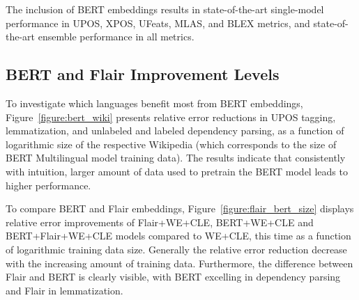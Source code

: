 \documentclass[11pt,a4paper]{article}
\begin{document}
The inclusion of BERT embeddings results in state-of-the-art single-model performance in UPOS, XPOS,
UFeats, MLAS, and BLEX metrics, and state-of-the-art ensemble performance in
all metrics. 

\subsection{BERT and Flair Improvement Levels}

To investigate which languages benefit most from BERT embeddings,
Figure~\ref{figure:bert_wiki} presents relative error
reductions in UPOS tagging, lemmatization, and unlabeled and labeled
dependency parsing, as a function of logarithmic size of the respective Wikipedia
(which corresponds to the size of BERT Multilingual model training data).
The results indicate that consistently with intuition, larger amount of
data used to pretrain the BERT model leads to higher performance.

To compare BERT and Flair embeddings, Figure~\ref{figure:flair_bert_size}
displays relative error improvements of Flair+WE+CLE, BERT+WE+CLE and
BERT+Flair+WE+CLE models compared to WE+CLE, this time as a function of
logarithmic training data size. Generally the relative error reduction decrease
with the increasing amount of training data. Furthermore, the difference
between Flair and BERT is clearly visible, with BERT excelling in dependency
parsing and Flair in lemmatization.
\end{document}
